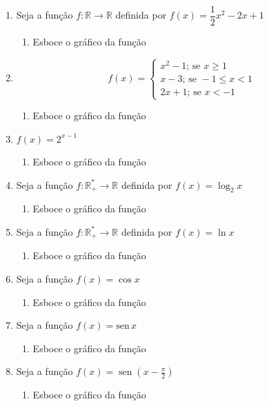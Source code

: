 \documentclass[a4paper]{article}
\DeclareMathOperator {\sen}{sen}
\begin{document}
\begin{enumerate}
	\item Seja a função $ f: \mathbb{R} \to \mathbb{R} $ definida por 
	$ f(x) = \dfrac{1}{2} x^2 - 2x +1 $
	\begin{enumerate}
		\item Esboce o gráfico da função
	\end{enumerate}
	
	
	\item $$ f(x) = 
		\begin{cases}
			
			x^2 - 1; \, \textrm{se } x \geq 1 \\
			x - 3; \, \textrm{se } -1 \leq x < 1 \\
			2x + 1; \, \textrm{se } x < -1
		
		\end{cases}
	$$	
	\begin{enumerate}
		\item Esboce o gráfico da função
	\end{enumerate}
	
	\item $ f(x) = 2^{x-1} $
		\begin{enumerate}
		\item Esboce o gráfico da função
	\end{enumerate}
	
	\item Seja a função $ f: \mathbb{R}^*_+ \to \mathbb{R} $ definida por 
	$ f(x) = \log_2 x $
	\begin{enumerate}
		\item Esboce o gráfico da função
	\end{enumerate}
	
	\item Seja a função $ f: \mathbb{R}^*_+ \to \mathbb{R} $ definida por 
	$ f(x) = \ln x $
	\begin{enumerate}
		\item Esboce o gráfico da função
	\end{enumerate}
	
	\item Seja a função $ f(x) = \cos x $
	\begin{enumerate}
		\item Esboce o gráfico da função
	\end{enumerate}
	
	\item Seja a função $ f(x) = \textrm{sen} \, x $
	\begin{enumerate}
		\item Esboce o gráfico da função
	\end{enumerate}
	
	\item Seja a função $ f(x) = \sen \left(x - \frac{\pi}{2}\right) $
	\begin{enumerate}
		\item Esboce o gráfico da função
	\end{enumerate}
	
\end{enumerate}
\end{document}
